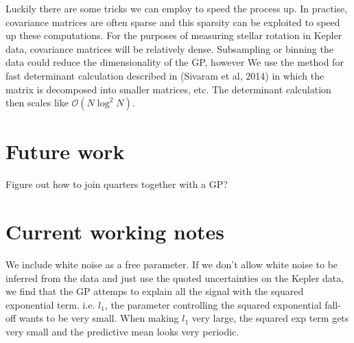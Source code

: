 \documentclass[12pt,preprint]{aastex}
\begin{document}
Luckily there are some tricks we can employ to speed the process up. %
In practise, covariance matrices are often sparse and this sparsity can be exploited to speed up these computations.
For the purposes of measuring stellar rotation in Kepler data, covariance matrices will be relatively dense.
Subsampling or binning the data could reduce the dimensionality of the GP, however %
We use the method for fast determinant calculation described in (Sivaram et al, 2014) in which the matrix is decomposed into smaller matrices, etc.
The determinant calculation then scales like $\mathcal{O}(N\log^2{N})$.

\section{Future work}

Figure out how to join quarters together with a GP?

\section{Current working notes}

We include white noise as a free parameter.
If we don't allow white noise to be inferred from the data and just use the quoted uncertainties on the Kepler data, we find that the GP attemps to explain all the signal with the squared exponential term.
i.e. $l_1$, the parameter controlling the squared exponential fall-off wants to be very small.
When making $l_1$ very large, the squared exp term gets very small and the predictive mean looks very periodic.
\end{document}
